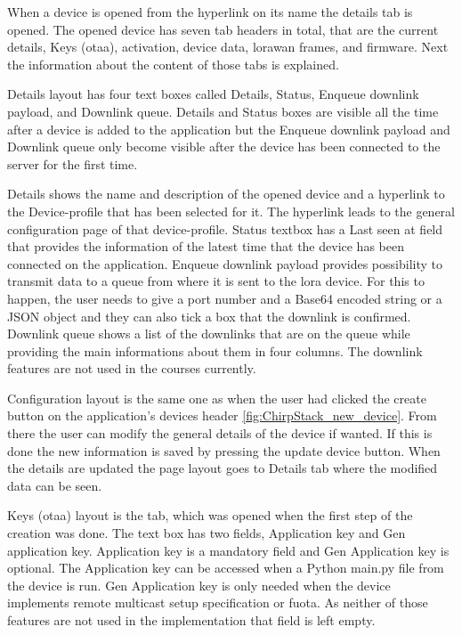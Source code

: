 When a device is opened from the hyperlink on its name the details tab is opened.
The opened device has seven tab headers in total, that are the current details, Keys (\gls{otaa}), activation, device data, \gls{lorawan} frames, and firmware.
Next the information about the content of those tabs is explained.

Details layout has four text boxes called Details, Status, Enqueue downlink payload, and Downlink queue.
Details and Status boxes are visible all the time after a device is added to the application but the Enqueue downlink payload and Downlink queue only become visible after the device has been connected to the server for the first time.

Details shows the name and description of the opened device and a hyperlink to the Device-profile that has been selected for it.
The hyperlink leads to the general configuration page of that device-profile.
Status textbox has a Last seen at field that provides the information of the latest time that the device has been connected on the application.
Enqueue downlink payload provides possibility to transmit data to a queue from where it is sent to the \gls{lora} device. For this to happen, the user needs to give a port number and a Base64 encoded string or a JSON object and they can also tick a box  that the downlink is confirmed.
Downlink queue shows  a list of the downlinks that are on the queue while providing the main informations about them in four columns.
The downlink features are not used in the courses currently.

Configuration layout is the same one as when the user had clicked the create button on the application's devices header \ref{fig:ChirpStack_new_device}.
From there the user can modify the general details of the device if wanted.
If this is done the new information is saved by pressing the update device button.
When the details are updated the page layout goes to Details tab where the modified data can be seen.

Keys (\gls{otaa}) layout is the tab, which was opened when the first step of the creation was done.
The text box has two fields, Application key and Gen application key.
Application key is a mandatory field and Gen Application key is optional.
The Application key can be accessed when a Python main.py file from the device is run.
Gen Application key is only needed when the device implements remote multicast setup specification or \gls{fuota}.
As neither of those features are not used in the implementation that field is left empty.

